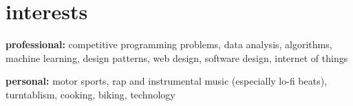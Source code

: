 \documentclass{friggeri-cv}
\begin{document}



  \section{interests}

    \textbf{professional:} competitive programming problems, data analysis, algorithms, machine learning, design patterns, web design, software design, internet of things

    \textbf{personal:} motor sports, rap and instrumental music (especially lo-fi beats), turntablism, cooking, biking, technology

\end{document}
